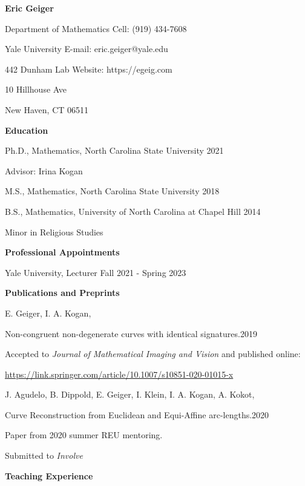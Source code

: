 \documentclass{article}
\begin{document}
\textsf{\textbf{\LARGE Eric Geiger}}

\bigskip

Department of Mathematics \hfill Cell: (919) 434-7608 

Yale University \hfill E-mail: eric.geiger@yale.edu

442 Dunham Lab \hfill Website: https://egeig.com 

10 Hillhouse Ave

New Haven, CT 06511


\bigskip
\bigskip
\bigskip

\textsf{\textbf{\Large Education} \hrulefill}

\medskip
Ph.D., Mathematics, North Carolina State University \hfill  2021

Advisor: Irina Kogan

\medskip
 M.S., Mathematics, North Carolina State University  \hfill 2018

\medskip
B.S., Mathematics, University of North Carolina at Chapel Hill \hfill 2014

Minor in Religious Studies
        
\bigskip
\bigskip

\textsf{\textbf{\Large Professional Appointments} \hrulefill}

\medskip
Yale University, Lecturer  \hfill Fall 2021 - Spring 2023

%
\bigskip
\bigskip

\textsf{\textbf{\Large Publications and Preprints} \hrulefill}

\medskip
E. Geiger, I. A. Kogan, 

Non-congruent non-degenerate curves with identical signatures.\hfill 2019

Accepted to \textit{Journal of Mathematical Imaging and Vision} and published online:

\url{https://link.springer.com/article/10.1007/s10851-020-01015-x}

\medskip
J. Agudelo, B. Dippold, E. Geiger, I. Klein, I. A. Kogan, A. Kokot,

Curve Reconstruction from Euclidean and Equi-Affine arc-lengths.\hfill 2020

Paper from 2020 summer REU mentoring.

Submitted to \textit{Involve}

\bigskip
\bigskip

\textsf{\textbf{\Large Teaching Experience} \hrulefill}
\end{document}
